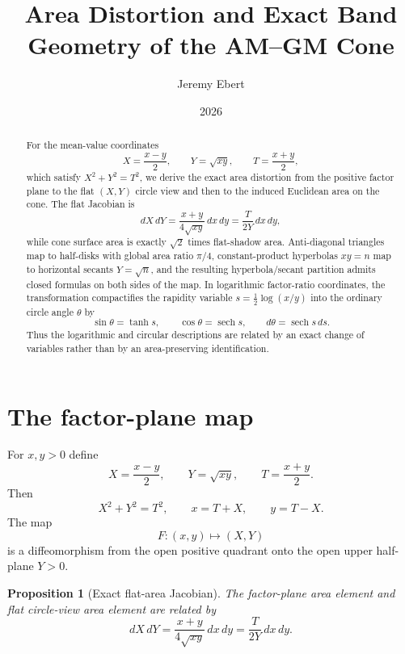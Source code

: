 \documentclass[11pt]{amsart}
\title{Area Distortion and Exact Band Geometry of the AM--GM Cone}
\author{Jeremy Ebert}
\date{2026}
\newtheorem{proposition}{Proposition}
\theoremstyle{remark}
\begin{document}
\maketitle

\begin{abstract}
For the mean-value coordinates
\[
X=\frac{x-y}{2},\qquad Y=\sqrt{xy},\qquad T=\frac{x+y}{2},
\]
which satisfy $X^2+Y^2=T^2$, we derive the exact area distortion from the positive factor plane to the flat $(X,Y)$ circle view and then to the induced Euclidean area on the cone.  The flat Jacobian is
\[
dX\,dY=\frac{x+y}{4\sqrt{xy}}\,dx\,dy=\frac{T}{2Y}\,dx\,dy,
\]
while cone surface area is exactly $\sqrt2$ times flat-shadow area.  Anti-diagonal triangles map to half-disks with global area ratio $\pi/4$, constant-product hyperbolas $xy=n$ map to horizontal secants $Y=\sqrt n$, and the resulting hyperbola/secant partition admits closed formulas on both sides of the map.  In logarithmic factor-ratio coordinates, the transformation compactifies the rapidity variable $s=\tfrac12\log(x/y)$ into the ordinary circle angle $\theta$ by
\[
\sin\theta=\tanh s,\qquad \cos\theta=\operatorname{sech}s,\qquad d\theta=\operatorname{sech}s\,ds.
\]
Thus the logarithmic and circular descriptions are related by an exact change of variables rather than by an area-preserving identification.
\end{abstract}

\section{The factor-plane map}
For $x,y>0$ define
\begin{equation}
X=\frac{x-y}{2},\qquad Y=\sqrt{xy},\qquad T=\frac{x+y}{2}. \tag{1}
\end{equation}
Then
\begin{equation}
X^2+Y^2=T^2,\qquad x=T+X,\qquad y=T-X. \tag{2}
\end{equation}
The map
\[
F:(x,y)\longmapsto(X,Y)
\]
is a diffeomorphism from the open positive quadrant onto the open upper half-plane $Y>0$.

\begin{proposition}[Exact flat-area Jacobian]\label{prop:flatjac}
The factor-plane area element and flat circle-view area element are related by
\begin{equation}
\boxed{
 dX\,dY=\frac{x+y}{4\sqrt{xy}}\,dx\,dy
 =\frac{T}{2Y}\,dx\,dy.}
\tag{3}
\end{equation}
\end{proposition}
\end{document}
